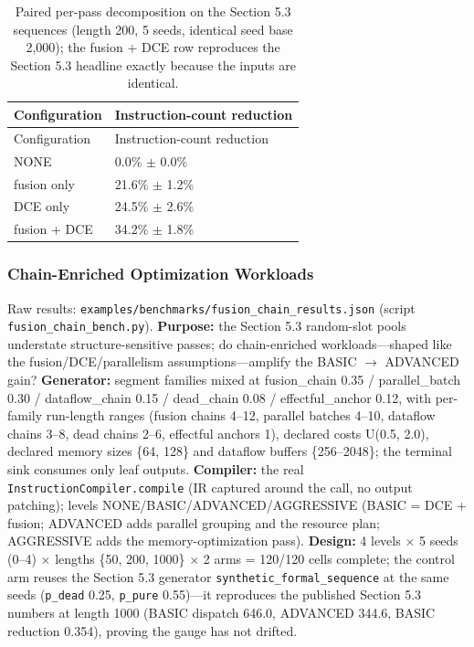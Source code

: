 \documentclass[
  11pt,
]{article}
\begin{document}
\begin{longtable}[]{@{}ll@{}}
\caption{Paired per-pass decomposition on the Section 5.3 sequences
(length 200, 5 seeds, identical seed base 2,000); the fusion + DCE row
reproduces the Section 5.3 headline exactly because the inputs are
identical.}\tabularnewline
\toprule\noalign{}
Configuration & Instruction-count reduction \\
\midrule\noalign{}
\endfirsthead
\toprule\noalign{}
Configuration & Instruction-count reduction \\
\midrule\noalign{}
\endhead
\bottomrule\noalign{}
\endlastfoot
NONE & 0.0\% \(\pm\) 0.0\% \\
fusion only & 21.6\% \(\pm\) 1.2\% \\
DCE only & 24.5\% \(\pm\) 2.6\% \\
fusion + DCE & 34.2\% \(\pm\) 1.8\% \\
\end{longtable}

\subsubsection{Chain-Enriched Optimization
Workloads}\label{chain-enriched-optimization-workloads}

Raw results: \texttt{examples/benchmarks/fusion\_chain\_results.json}
(script \texttt{fusion\_chain\_bench.py}). \textbf{Purpose:} the Section
5.3 random-slot pools understate structure-sensitive passes; do
chain-enriched workloads---shaped like the fusion/DCE/parallelism
assumptions---amplify the BASIC \(\rightarrow\) ADVANCED gain?
\textbf{Generator:} segment families mixed at fusion\_chain 0.35 /
parallel\_batch 0.30 / dataflow\_chain 0.15 / dead\_chain 0.08 /
effectful\_anchor 0.12, with per-family run-length ranges (fusion chains
4--12, parallel batches 4--10, dataflow chains 3--8, dead chains 2--6,
effectful anchors 1), declared costs U(0.5, 2.0), declared memory sizes
\{64, 128\} and dataflow buffers \{256--2048\}; the terminal sink
consumes only leaf outputs. \textbf{Compiler:} the real
\texttt{InstructionCompiler.compile} (IR captured around the call, no
output patching); levels NONE/BASIC/ADVANCED/AGGRESSIVE (BASIC = DCE +
fusion; ADVANCED adds parallel grouping and the resource plan;
AGGRESSIVE adds the memory-optimization pass). \textbf{Design:} 4 levels
\(\times\) 5 seeds (0--4) \(\times\) lengths \{50, 200, 1000\}
\(\times\) 2 arms = 120/120 cells complete; the control arm reuses the
Section 5.3 generator \texttt{synthetic\_formal\_sequence} at the same
seeds (\texttt{p\_dead} 0.25, \texttt{p\_pure} 0.55)---it reproduces the
published Section 5.3 numbers at length 1000 (BASIC dispatch 646.0,
ADVANCED 344.6, BASIC reduction 0.354), proving the gauge has not
drifted.
\end{document}
